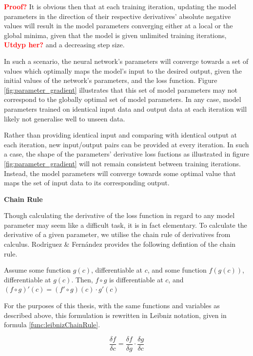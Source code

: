 \textcolor{red}{\textbf{Proof?}} It is obvious then that at each training iteration, 
updating the model parameters in the direction of their respective derivatives' absolute negative values
will result in the model parameters converging either at a local or the global minima,
given that the model is given unlimited training iterations, \textcolor{red}{\textbf{Utdyp her?}} and a decreasing step size.

In such a scenario, the neural network's parameters will converge towards a set of values which optimally maps the model's input to the desired output,
given the initial values of the network's parameters, and the loss function. Figure \ref{fig:parameter_gradient} illustrates that this set of model parameters
may not correspond to the globally optimal set of model parameters. In any case, model parameters trained on identical input data and output data at each iteration
will likely not generalise well to unseen data.

Rather than providing identical input and comparing with identical output at each iteration, new input/output pairs can be provided at every iteration. 
In such a case, the shape of the parameters' derivative loss fuctions as illustrated in figure \ref{fig:parameter_gradient} 
will not remain consistent between training iterations. Instead, the model parameters will converge towards some optimal value
that maps the set of input data to its corresponding output.


\textbf{Chain Rule}

Though calculating the derivative of the loss function in regard to any model parameter may seem like a difficult task, it is in fact elementary.
To calculate the derivative of a given parameter, we utilise the chain rule of derivatives from calculus.
Rodriguez \& Fernández provides the following defintion of the chain rule.

Assume some function $ g(c) $, differentiable at $ c $, and some function $ f(g(c)) $, differentiable at $ g(c) $. 
Then, $ f \circ g $ is differentiable at $ c $, and $ (f \circ g)'(c) = (f' \circ g)(c) \cdot g'(c)  $ \cite{chainRule} 

For the purposes of this thesis, with the same functions and variables as described above, this formulation is rewritten in Leibniz notation, given in formula \ref{func:leibnizChainRule}.

\[
    \frac{\delta f}{\delta c} = \frac{\delta f}{\delta g} \cdot \frac{\delta g}{\delta c} \tag{2.8} \label{func:leibnizChainRule}
\]

